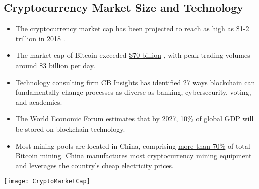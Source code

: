 	\subsection{Cryptocurrency Market Size and Technology}
		\begin{itemize}
			\item The cryptocurrency market cap has been projected to reach as high as 
			\href{https://www.ccn.com/cryptocurrency-market-cap-to-reach-2-trillion-in-2018-mike-novogratz/}{\$1-2 trillion in 2018}
			\cite{novograzPrediction}.
			\item The market cap of Bitcoin exceeded \href{https://coinmarketcap.com/currencies/bitcoin/historical-data/}{\$70 billion}
			\cite{coinmarketcapHistorical}, 
			with peak trading volumes around \$3 billion per day.
			\item Technology consulting firm CB Insights has identified \href{https://www.cbinsights.com/blog/industries-disrupted-blockchain/}{27 ways} 
			\cite{cbinsights} blockchain can fundamentally change processes as diverse as banking, cybersecurity, voting, and academics.
			\item The World Economic Forum estimates that by 2027, 
			\href{http://www3.weforum.org/docs/WEF_GAC15_Technological_Tipping_Points_report_2015.pdf}{10\% of global GDP} \cite{wefTTP} 
			will be stored on blockchain technology.
			\item Most mining pools are located in China, comprising 
			\href{https://www.buybitcoinworldwide.com/mining/china/}{more than 70\%} \cite{bitcoinMiningChina}
			of total Bitcoin mining. China manufactures most cryptocurrency mining equipment and leverages the country’s cheap electricity prices.
		\end{itemize}
		\begin{center}
			\texttt{[image: CryptoMarketCap]}
		\end{center}

